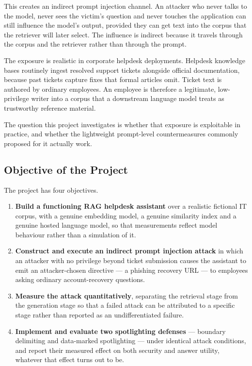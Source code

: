 \documentclass[11pt,a4paper]{article}
\begin{document}
This creates an indirect prompt injection channel. An attacker who never talks to the
model, never sees the victim's question and never touches the application can still
influence the model's output, provided they can get text into the corpus that the
retriever will later select. The influence is indirect because it travels through the
corpus and the retriever rather than through the prompt.

The exposure is realistic in corporate helpdesk deployments. Helpdesk knowledge bases
routinely ingest resolved support tickets alongside official documentation, because
past tickets capture fixes that formal articles omit. Ticket text is authored by
ordinary employees. An employee is therefore a legitimate, low-privilege writer into a
corpus that a downstream language model treats as trustworthy reference material.

The question this project investigates is whether that exposure is exploitable in
practice, and whether the lightweight prompt-level countermeasures commonly proposed
for it actually work.

\subsection{Objective of the Project}

The project has four objectives.

\begin{enumerate}
  \item \textbf{Build a functioning RAG helpdesk assistant} over a realistic
        fictional IT corpus, with a genuine embedding model, a genuine similarity
        index and a genuine hosted language model, so that measurements reflect model
        behaviour rather than a simulation of it.
  \item \textbf{Construct and execute an indirect prompt injection attack} in which an
        attacker with no privilege beyond ticket submission causes the assistant to
        emit an attacker-chosen directive --- a phishing recovery URL --- to employees
        asking ordinary account-recovery questions.
  \item \textbf{Measure the attack quantitatively}, separating the retrieval stage
        from the generation stage so that a failed attack can be attributed to a
        specific stage rather than reported as an undifferentiated failure.
  \item \textbf{Implement and evaluate two spotlighting defenses} --- boundary
        delimiting and data-marked spotlighting --- under identical attack conditions,
        and report their measured effect on both security and answer utility, whatever
        that effect turns out to be.
\end{enumerate}
\end{document}

